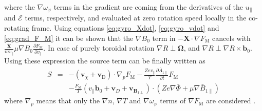 \documentclass[a4paper,10pt]{article}
\newcommand{\st}[1]{\mathrm{#1}} %
\renewcommand{\vec}[1]{\mathbf{#1}}
\begin{document}
where the $\nabla \omega_{\varphi}$ terms in the gradient are coming from the derivatives of the $u_{\parallel}$ and $\mathcal{E}$ terms, respectively, and evaluated at zero rotation speed locally in the co-rotating frame. Using equations \ref{eq:gyro_Xdot}, \ref{eq:gyro_vdot} and \ref{eq:grad_F_M} it can be shown that the $\nabla B_0$ term in $- \dot{\vec{X}} \cdot \nabla F_{\st{M}}$ cancels with $\frac{\dot{\vec{X}}}{m v_{\parallel}} \mu \nabla B_0 \frac{\partial F_{\st{M}}}{\partial v_{\parallel}}$. In case of purely toroidal rotation $\nabla R \perp \vec{\Omega}$, and $\nabla R \perp \nabla R \times \vec{b}_0$. Using these expression the source term can be finally written as
\begin{eqnarray*} 
	S &=& - \left( \mathbf{v}_{\chi} + \mathbf{v}_{\st{D}} \right) \cdot \nabla_p F_{\st{M}} - \frac{Z e v_{\parallel}}{T} \frac{\partial \bar{A}_{1 \parallel}}{\partial t} F_{\st{M}} \\
	&& - \frac{F_{\st{M}}}{T} \left( v_{\parallel} \mathbf{b}_0 + \mathbf{v}_{D} + \mathbf{v}_{\vec{B}_{1 \perp}} \right) \cdot \left( Z e \nabla \bar{\Phi} + \mu \nabla \bar{B}_{1 \parallel} \right)
\end{eqnarray*}
where $\nabla_p$ means that only the $\nabla n$, $\nabla T$ and $\nabla \omega_{\varphi}$ terms of $\nabla F_{\st{M}}$ are considered \cite{gkw}. 
\end{document}
